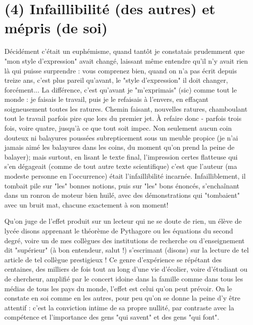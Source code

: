 \section{(4) Infaillibilité (des autres) et mépris (de soi)}

Décidément c'était un euphémisme, quand tantôt je constatais prudemment que "mon style d'expression" avait changé, laissant même entendre qu'il n'y avait rien là qui puisse surprendre : vous comprenez bien, quand on n'a pas écrit depuis treize ans, c'est plus pareil qu'avant, le "style d'expression" il doit changer, forcément... La différence, c'est qu'avant je "m'exprimais" (sic) comme tout le monde : je faisais le travail, puis je le refaisais à l'envers, en effaçant soigneusement toutes les ratures. Chemin faisant, nouvelles ratures, chamboulant tout le travail parfois pire que lors du premier jet. À refaire donc - parfois trois fois, voire quatre, jusqu'à ce que tout soit impec. Non seulement aucun coin douteux ni balayures poussées subrepticement sous un meuble propice (je n'ai jamais aimé les balayures dans les coins, du moment qu'on prend la peine de balayer); mais surtout, en lisant le texte final, l'impression certes flatteuse qui s'en dégageait (comme de tout autre texte scientifique) c'est que l'auteur (ma modeste personne en l'occurrence) était l'infaillibilité incarnée. Infailliblement, il tombait pile sur "les" bonnes notions, puis sur "les" bons énoncés, s'enchaînant dans un ronron de moteur bien huilé, avec des démonstrations qui "tombaient" avec un bruit mat, chacune exactement à son moment!

Qu'on juge de l'effet produit sur un lecteur qui ne se doute de rien, un élève de lycée disons apprenant le théorème de Pythagore ou les équations du second degré, voire un de mes collègues des institutions de recherche ou d'enseignement dit "supérieur" (à bon entendeur, salut !) s'escrimant (disons) sur la lecture de tel article de tel collègue prestigieux ! Ce genre d'expérience se répétant des centaines, des milliers de fois tout au long d'une vie d'écolier, voire d'étudiant ou de chercheur, amplifié par le concert idoine dans la famille comme dans tous les médias de tous les pays du monde, l'effet est celui qu'on peut prévoir. On le constate en soi comme en les autres, pour peu qu'on se donne la peine d'y être attentif : c'est la conviction intime de sa propre nullité, par contraste avec la compétence et l'importance des gens "qui savent" et des gens "qui font".


